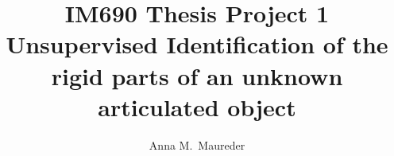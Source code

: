 \documentclass[master,english]{hgbthesis}
\author{Anna M.\ Maureder}
\title{IM690 Thesis Project 1\\ %
	Unsupervised Identification of the rigid parts of an unknown articulated object}	%
\begin{document}

\frontmatter							%

\maketitle
\tableofcontents




\mainmatter          			%







%


\appendix                                         %


\MakeBibliography                        				%

%

\end{document}
